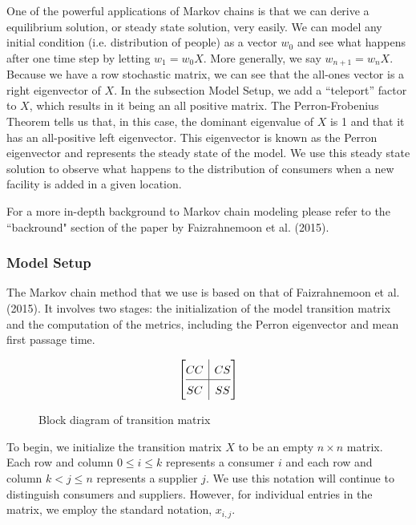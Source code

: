 \documentclass[twoside,twocolumn]{article}
\begin{document}
One of the powerful applications of Markov chains is that we can derive a equilibrium solution, or steady state solution, very easily. %
We can model any initial condition (i.e. distribution of people) as a vector $w_0$ and see what happens after one time step by letting $w_1 = w_0 X$.
More generally, we say $w_{n + 1} = w_n X$.
Because we have a row stochastic matrix, we can see that the all-ones vector is a right eigenvector of $X$.
In the subsection Model Setup, we add a ``teleport'' factor to $X$, which results in it being an all positive matrix.
The Perron-Frobenius Theorem tells us that, in this case, the dominant eigenvalue of $X$ is 1 and that it has an all-positive left eigenvector.
This eigenvector is known as the Perron eigenvector and represents the steady state of the model. %
We use this steady state solution to observe what happens to the distribution of consumers when a new facility is added in a given location.

For a more in-depth background to Markov chain modeling please refer to the ``backround" section of the paper by Faizrahnemoon et al. (2015).


\subsubsection{Model Setup}

The Markov chain method that we use is based on that of Faizrahnemoon et al. (2015).
It involves two stages: the initialization of the model transition matrix and the computation of the metrics, including the Perron eigenvector and mean first passage time.

\begin{figure}
\[
\renewcommand{\arraystretch}{1.5}
\left[\begin{array}{@{}c|c@{}}
  CC &
  CS
\\ \hline
  SC
  & SS
\end{array}\right]
\]
\caption{Block diagram of transition matrix}
\end{figure}


To begin, we initialize the transition matrix $X$ to be an empty $n \times n$ matrix.
Each row and column $0 \leq i \leq k$ represents a consumer $i$ and each row and column $k < j \leq n$ represents a supplier $j$.
We use this notation will continue to distinguish consumers and suppliers.
However, for individual entries in the matrix, we employ the standard notation, $x_{i,j}$.
\end{document}
